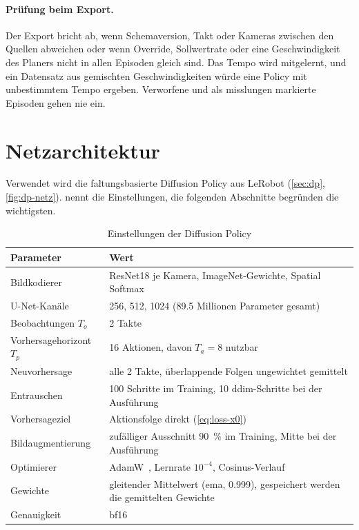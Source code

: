 \paragraph{Prüfung beim Export.} Der Export bricht ab, wenn Schemaversion, Takt oder Kameras
zwischen den Quellen abweichen oder wenn Override, Sollwertrate oder eine Geschwindigkeit des
Planers nicht in allen Episoden gleich sind. Das Tempo wird mitgelernt, und ein Datensatz aus
gemischten Geschwindigkeiten würde eine Policy mit unbestimmtem Tempo ergeben. Verworfene und
als misslungen markierte Episoden gehen nie ein.

\section{Netzarchitektur}
\label{sec:netz}

Verwendet wird die faltungsbasierte Diffusion Policy aus LeRobot (\cref{sec:dp},
\cref{fig:dp-netz}).  nennt die Einstellungen, die folgenden Abschnitte
begründen die wichtigsten.

\begin{table}[htbp]
  \centering
  \caption{Einstellungen der Diffusion Policy}
  \label{tab:hyper}
  \small
  \begin{tabularx}{\textwidth}{@{}l X@{}}
    \toprule
    Parameter & Wert \\
    \midrule
    Bildkodierer & ResNet18 je Kamera, ImageNet-Gewichte, Spatial Softmax \\
    U-Net-Kanäle & 256, 512, 1024 (\num{89.5} Millionen Parameter gesamt) \\
    Beobachtungen $T_o$ & 2 Takte \\
    Vorhersagehorizont $T_p$ & 16 Aktionen, davon $T_a = 8$ nutzbar \\
    Neuvorhersage & alle 2 Takte, überlappende Folgen ungewichtet gemittelt \\
    Entrauschen & 100 Schritte im Training, 10 \acs{ddim}-Schritte bei der Ausführung \\
    Vorhersageziel & Aktionsfolge direkt (\cref{eq:loss-x0}) \\
    Bildaugmentierung & zufälliger Ausschnitt \SI{90}{\percent} im Training, Mitte bei der
      Ausführung \\
    Optimierer & AdamW~\cite{loshchilov2019}, Lernrate $10^{-4}$, Cosinus-Verlauf \\
    Gewichte & gleitender Mittelwert (\acs{ema}, \num{0.999}), gespeichert werden die
      gemittelten Gewichte \\
    Genauigkeit & bf16 \\
    \bottomrule
  \end{tabularx}
\end{table}

